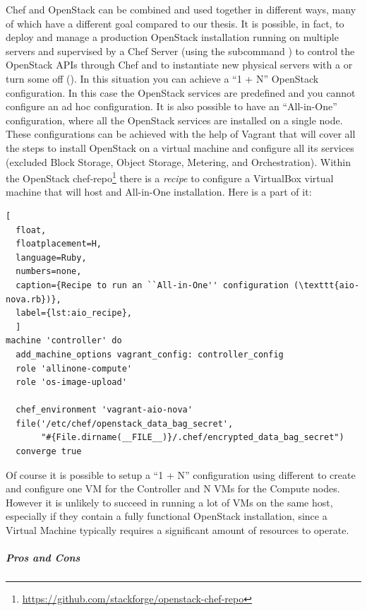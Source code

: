 Chef and OpenStack can be combined and used together in different ways, many of which have a different goal compared to our thesis. It is possible, in fact, to deploy and manage a production OpenStack installation running on multiple servers and supervised by a Chef Server (using the subcommand ) to control the OpenStack APIs through Chef and to instantiate new physical servers with a  or turn some off ().
In this situation you can achieve a ``1 + N'' OpenStack configuration. In this case the OpenStack services are predefined and you cannot configure an ad hoc configuration.
It is also possible to have an ``All-in-One'' configuration, where all the OpenStack services are installed on a single node.\\
These configurations can be achieved with the help of Vagrant that will cover all the steps to install OpenStack on a virtual machine and configure all its services (excluded Block Storage, Object Storage, Metering, and Orchestration). Within the OpenStack chef-repo\footnote{\url{https://github.com/stackforge/openstack-chef-repo}} there is a \textit{recipe} to configure a VirtualBox virtual machine that will host and All-in-One installation. Here is a part of it:

\begin{lstlisting}[
  float,
  floatplacement=H,
  language=Ruby,
  numbers=none,
  caption={Recipe to run an ``All-in-One'' configuration (\texttt{aio-nova.rb})},
  label={lst:aio_recipe},
  ]
machine 'controller' do
  add_machine_options vagrant_config: controller_config
  role 'allinone-compute'
  role 'os-image-upload'

  chef_environment 'vagrant-aio-nova'
  file('/etc/chef/openstack_data_bag_secret',
       "#{File.dirname(__FILE__)}/.chef/encrypted_data_bag_secret")
  converge true
\end{lstlisting}

Of course it is possible to setup a ``1 + N'' configuration using different  to create and configure one VM for the Controller and N VMs for the Compute nodes. However it is unlikely to succeed in running a lot of VMs on the same host, especially if they contain a fully functional OpenStack installation, since a Virtual Machine typically requires a significant amount of resources to operate.

\subparagraph{Pros and Cons}
\label{subp:sota_chef_pro_cons}

